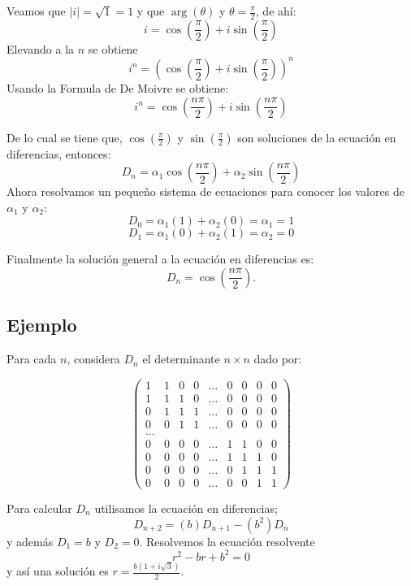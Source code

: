 \documentclass{report}
\begin{document}
Veamos que  $|i|=\sqrt{1}=1$ y que $\arg(\theta)$ y $\theta= \frac{\pi}{2}$, de ahí:
$$i=\cos(\frac{\pi}{2})+i\sin(\frac{\pi}{2})$$
Elevando a la $n$ se obtiene
$$i^n=(\cos(\frac{\pi}{2})+i\sin(\frac{\pi}{2}))^{n}$$
Usando la Formula de De Moivre se obtiene:
$$i^n=\cos(\frac{n\pi}{2})+i\sin(\frac{n\pi}{2})$$

De lo cual se tiene que, $\cos(\frac{\pi}{2})$ y  $\sin(\frac{\pi}{2})$ son soluciones de la ecuación en diferencias, entonces: 
$$D_{n}=\alpha_{1}\cos(\frac{n\pi}{2})+\alpha_{2}\sin(\frac{n\pi}{2})$$
Ahora resolvamos un pequeño sistema de ecuaciones para conocer los valores de $\alpha_1$ y $\alpha_2$:
  $$D_{0}=\alpha_{1}(1)+\alpha_{2}(0)=\alpha_{1}=1$$
  $$D_{1}=\alpha_{1}(0)+\alpha_{2}(1)=\alpha_{2}=0$$

Finalmente la solución general a la ecuación en diferencias es:
\begin{equation}
  \label{solucion determinante}
D_{n}=\cos(\frac{n\pi}{2}).
\end{equation}


\subsection{Ejemplo}

Para cada $n$, considera $D_{n}$ el determinante $n\times n$ dado por:

\begin{equation*}
\begin{pmatrix}
1 & 1 & 0 & 0 &\ldots & 0 & 0 & 0 & 0\\
1 & 1 & 1 & 0 &\ldots & 0 & 0 & 0 & 0\\
0 & 1 & 1 & 1 &\ldots & 0 & 0 & 0 & 0\\
0 & 0 & 1 & 1 &\ldots & 0 & 0 & 0 & 0\\
\ldots\\
0 & 0 & 0 & 0 &\ldots & 1 & 1 & 0 & 0\\
0 & 0 & 0 & 0 &\ldots & 1 & 1 & 1 & 0\\
0 & 0 & 0 & 0 &\ldots & 0 & 1 & 1 & 1\\
0 & 0 & 0 & 0 &\ldots & 0 & 0 & 1 & 1
\end{pmatrix}
\end{equation*}


Para calcular $D_{n}$ utilisamos la ecuación en diferencias;
\begin{equation}
  \label{determinante}
D_{n+2}=(b)D_{n+1}-(b^2)D_{n}
\end{equation}
 y además $D_{1}=b$ y $D_{2}=0$.
Resolvemos la ecuación resolvente $$r^{2}-br+b^2=0$$ y así una solución es $r=\frac{b(1+i \sqrt{3})}{2}$.
\end{document}
